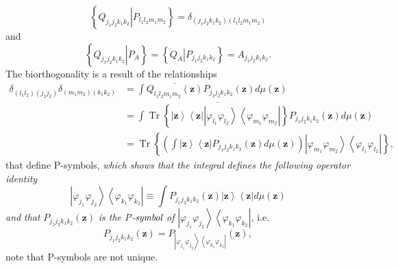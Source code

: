 \documentclass[aps,preprint]{revtex4}%
\begin{document}
\begin{equation}
\left\{  \left.  Q_{j_{1}j_{2}k_{1}k_{2}}\right\vert P_{l_{1}l_{2}m_{1}m_{2}%
}\right\}  =\delta_{\left(  j_{1}j_{2}k_{1}k_{2}\right)  \left(  l_{1}%
l_{2}m_{1}m_{2}\right)  }%
\end{equation}
and%
\begin{equation}
\left\{  \left.  Q_{j_{1}j_{2}k_{1}k_{2}}\right\vert P_{A}\right\}  =\left\{
\left.  Q_{A}\right\vert P_{j_{1}j_{2}k_{1}k_{2}}\right\}  =A_{j_{1}j_{2}%
k_{1}k_{2}}.
\end{equation}
The biorthogonality is a result of the relationships
\begin{align}
\delta_{\left(  l_{1}l_{2}\right)  \left(  j_{1}j_{2}\right)  }\delta_{\left(
m_{1}m_{2}\right)  \left(  k_{1}k_{2}\right)  }  &  =\int\overline
{Q_{l_{1}l_{2}m_{1}m_{2}}\left(  \mathbf{z}\right)  }P_{j_{1}j_{2}k_{1}k_{2}%
}\left(  \mathbf{z}\right)  d\mu\left(  \mathbf{z}\right) \nonumber\\
&  =\int\overline{\operatorname*{Tr}\left\{  \left\vert \mathbf{z}%
\right\rangle \left\langle \mathbf{z}\right\vert \left\vert \varphi_{l_{1}%
}\varphi_{l_{2}}\right\rangle \left\langle \varphi_{m_{1}}\varphi_{m_{2}%
}\right\vert \right\}  }P_{j_{1}j_{2}k_{1}k_{2}}\left(  \mathbf{z}\right)
d\mu\left(  \mathbf{z}\right) \nonumber\\
&  =\operatorname*{Tr}\left\{  \left(  \int\left\vert \mathbf{z}\right\rangle
\left\langle \mathbf{z}\right\vert P_{j_{1}j_{2}k_{1}k_{2}}\left(
\mathbf{z}\right)  d\mu\left(  \mathbf{z}\right)  \right)  \left\vert
\varphi_{m_{1}}\varphi_{m_{2}}\right\rangle \left\langle \varphi_{l_{1}%
}\varphi_{l_{2}}\right\vert \right\}  ,
\end{align}
that define P-symbols, \emph{which shows that the integral defines the
following operator identity}
\begin{equation}
\left\vert \varphi_{j_{1}}\varphi_{j_{2}}\right\rangle \left\langle
\varphi_{k_{1}}\varphi_{k_{2}}\right\vert \equiv\int P_{j_{1}j_{2}k_{1}k_{2}%
}\left(  \mathbf{z}\right)  \left\vert \mathbf{z}\right\rangle \left\langle
\mathbf{z}\right\vert d\mu\left(  \mathbf{z}\right)
\end{equation}
\emph{and} \emph{that }$P_{j_{1}j_{2}k_{1}k_{2}}\left(  \mathbf{z}\right)  $
\emph{is the P}$\emph{-symbol}$ \emph{of} $\left\vert \varphi_{j_{1}}%
\varphi_{j_{2}}\right\rangle \left\langle \varphi_{k_{1}}\varphi_{k_{2}%
}\right\vert $, i.e.
\begin{equation}
P_{j_{1}j_{2}k_{1}k_{2}}\left(  \mathbf{z}\right)  =P_{\left\vert
\varphi_{j_{1}}\varphi_{j_{2}}\right\rangle \left\langle \varphi_{k_{1}%
}\varphi_{k_{2}}\right\vert }\left(  \mathbf{z}\right)  ,
\end{equation}
note that P-symbols are not unique.
\end{document}
